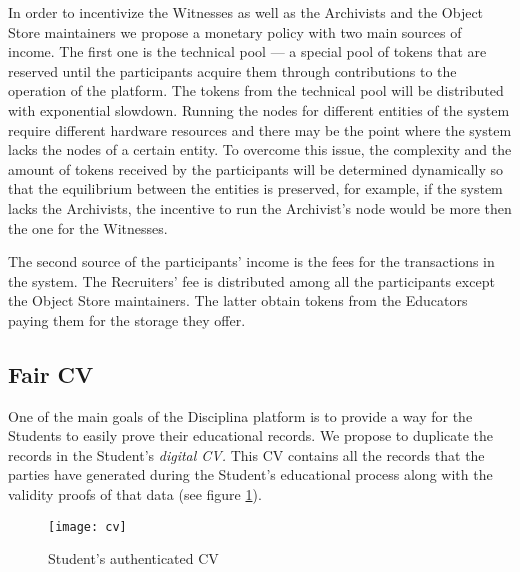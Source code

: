 In order to incentivize the Witnesses as well as the Archivists and the Object Store maintainers we propose a monetary policy with two main sources of income. The first one is the technical pool — a special pool of tokens that are reserved until the participants acquire them through contributions to the operation of the platform. The tokens from the technical pool will be distributed with exponential slowdown. Running the nodes for different entities of the system require different hardware resources and there may be the point where the system lacks the nodes of a certain entity. To overcome this issue, the complexity and the amount of tokens received by the participants will be determined dynamically so that the equilibrium between the entities is preserved, for example, if the system lacks the Archivists, the incentive to run the Archivist's node would be more then the one for the Witnesses.

The second source of the participants' income is the fees for the transactions in the system. The Recruiters' fee is distributed among all the participants except the Object Store maintainers. The latter obtain tokens from the Educators paying them for the storage they offer.

\subsection{Fair CV}
One of the main goals of the Disciplina platform is to provide a way for the Students to easily prove their educational records. We propose to duplicate the records in the Student's \textit{digital CV.} This CV contains all the records that the parties have generated during the Student's educational process along with the validity proofs of that data (see figure \ref{fig:cv}).

\begin{figure}[ht]
\centering
\texttt{[image: cv]}
\caption{Student's authenticated CV}
\label{fig:cv}
\end{figure}

